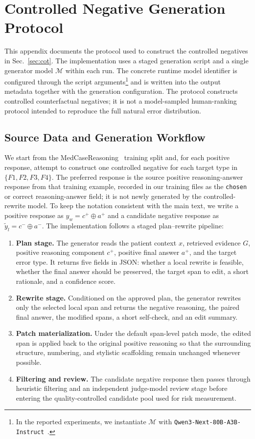 \documentclass[a4paper,fleqn,doubleblind]{cas-sc}
\begin{document}
\section{Controlled Negative Generation Protocol}
\label{app:negative_protocol}

This appendix documents the protocol used to construct the controlled negatives in Sec.~\ref{sec:cot}. The implementation uses a staged generation script and a single generator model $\mathcal{M}$ within each run. The concrete runtime model identifier is configured through the script arguments\footnote{In the reported experiments, we instantiate $\mathcal{M}$ with \texttt{Qwen3-Next-80B-A3B-Instruct}~\cite{yang2025qwen3}.} and is written into the output metadata together with the generation configuration. The protocol constructs controlled counterfactual negatives; it is not a model-sampled human-ranking protocol intended to reproduce the full natural error distribution.

\subsection{Source Data and Generation Workflow}

We start from the MedCaseReasoning~\cite{wu2025medcasereasoning} training split and, for each positive response, attempt to construct one controlled negative for each target type in $\{F1,F2,F3,F4\}$. The preferred response is the source positive reasoning-answer response from that training example, recorded in our training files as the \texttt{chosen} or correct reasoning-answer field; it is not newly generated by the controlled-rewrite model. To keep the notation consistent with the main text, we write a positive response as $y_w = c^{+} \oplus a^{+}$ and a candidate negative response as $\tilde{y}_l = c^{-} \oplus a^{-}$. The implementation follows a staged plan--rewrite pipeline:
\begin{enumerate}[leftmargin=*]
    \item \textbf{Plan stage.} The generator reads the patient context $x$, retrieved evidence $G$, positive reasoning component $c^{+}$, positive final answer $a^{+}$, and the target error type. It returns five fields in JSON: whether a local rewrite is feasible, whether the final answer should be preserved, the target span to edit, a short rationale, and a confidence score.
    \item \textbf{Rewrite stage.} Conditioned on the approved plan, the generator rewrites only the selected local span and returns the negative reasoning, the paired final answer, the modified spans, a short self-check, and an edit summary.
    \item \textbf{Patch materialization.} Under the default span-level patch mode, the edited span is applied back to the original positive reasoning so that the surrounding structure, numbering, and stylistic scaffolding remain unchanged whenever possible.
    \item \textbf{Filtering and review.} The candidate negative response then passes through heuristic filtering and an independent judge-model review stage before entering the quality-controlled candidate pool used for risk measurement.
\end{enumerate}
\end{document}
